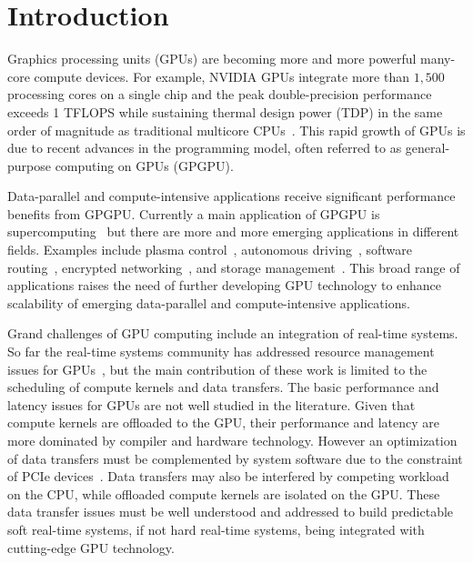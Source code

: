 \section{Introduction}
\label{sec:introduction}

Graphics processing units (GPUs) are becoming more and more powerful
many-core compute devices.
For example, NVIDIA GPUs integrate more than $1,500$ processing cores on
a single chip and the peak double-precision performance exceeds 1
TFLOPS while sustaining thermal design power (TDP) in the same order of
magnitude as traditional multicore CPUs~\cite{NVIDIA_Kepler}. 
This rapid growth of GPUs is due to recent advances in the
programming model, often referred to as general-purpose computing on
GPUs (GPGPU).

Data-parallel and compute-intensive applications receive significant
performance benefits from GPGPU.
Currently a main application of GPGPU is supercomputing~\cite{TOP500}
but there are more and more emerging applications in different fields.
Examples include plasma control~\cite{Kato_ICCPS13}, autonomous
driving~\cite{McNaughton_ICRA11}, software routing~\cite{Han_SIGCOMM10},
encrypted networking~\cite{Jang_NSDI11}, and storage
management~\cite{Bhatotia_FAST12, Gharaibeh_HPDC10, Kato_ATC12,
Sun_SYSTOR12}.
This broad range of applications raises the need of further developing
GPU technology to enhance scalability of emerging data-parallel and
compute-intensive applications.

Grand challenges of GPU computing include an integration of real-time
systems.
So far the real-time systems community has addressed resource management
issues for GPUs~\cite{Basaran_ECRTS12, Elliott_RTS12, Elliott_ECRTS12,
Kato_ATC11, Kato_RTAS11, Kato_RTSS11}, but the main contribution of
these work is limited to the scheduling of compute kernels and data
transfers.
The basic performance and latency issues for GPUs are not well studied
in the literature.
Given that compute kernels are offloaded to the GPU, their performance
and latency are more dominated by compiler and hardware technology.
However an optimization of data transfers must be complemented by system
software due to the constraint of PCIe devices~\cite{Kato_ATC12}.
Data transfers may also be interfered by competing workload on the CPU,
while offloaded compute kernels are isolated on the GPU.
These data transfer issues must be well understood and addressed to
build predictable soft real-time systems, if not hard real-time systems,
being integrated with cutting-edge GPU technology.

